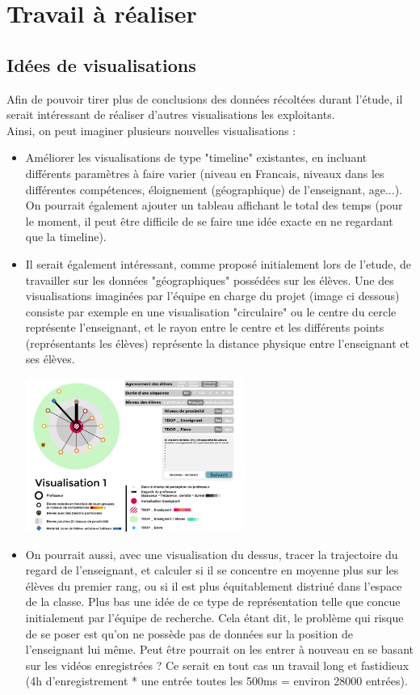 \documentclass{article}
\begin{document}
\section{Travail à réaliser}
\subsection{Idées de visualisations}
Afin de pouvoir tirer plus de conclusions des données récoltées durant l'étude, il serait intéressant de réaliser d'autres visualisations les exploitants.\\
Ainsi, on peut imaginer plusieurs nouvelles visualisations :
\begin{itemize}
  \item Améliorer les visualisations de type "timeline" existantes, en incluant différents paramètres à faire varier (niveau en Francais, niveaux dans les différentes compétences, éloignement (géographique) de l'enseignant, age...). On pourrait également ajouter un tableau affichant le total des temps (pour le moment, il peut être difficile de se faire une idée exacte en ne regardant que la timeline).
  \item Il serait également intéressant, comme proposé initialement lors de l'etude, de travailler sur les données "géographiques" possédées sur les élèves. Une des visualisations imaginées par l'équipe en charge du projet (image ci dessous) consiste par exemple en une visualisation "circulaire" ou le centre du cercle représente l'enseignant, et le rayon entre le centre et les différents points (représentants les élèves) représente la distance physique entre l'enseignant et ses élèves.\\
    \begin{center}
      \includegraphics[height=5cm]{visu_cercle.png}
    \end{center}
  \item On pourrait aussi, avec une visualisation du dessus, tracer la trajectoire du regard de l'enseignant, et calculer si il se concentre en moyenne plus sur les élèves du premier rang, ou si il est plus équitablement distriué dans l'espace de la classe. Plus bas une idée de ce type de représentation telle que concue initialement par l'équipe de recherche. Cela étant dit, le problème qui risque de se poser est qu'on ne possède pas de données sur la position de l'enseignant lui même. Peut être pourrait on les entrer à nouveau en se basant sur les vidéos enregistrées ? Ce serait en tout cas un travail long et fastidieux (4h d'enregistrement * une entrée toutes les 500ms = environ 28000 entrées).\\

\end{itemize}
\end{document}
